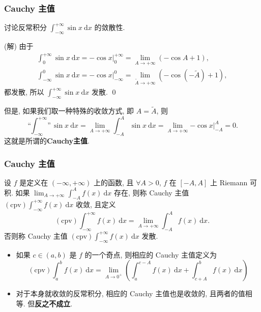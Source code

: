 \begin{frame}
\frametitle{Cauchy 主值}

\begin{eg}
讨论反常积分 $\int_{-\infty}^{+\infty} \sin x~ \mathrm{d} x$ 的敛散性.
\end{eg}

\pause
\vspace{0.5em}

\startproof[bg=yellow, fg=red](解)
由于
\begin{gather*}
\int_0^{+\infty} \sin x ~ \mathrm{d} x = \left. -\cos x \right|_0^{+\infty} = \lim_{A \to +\infty} \left(-\cos A + 1\right), \\
\int_{-\infty}^0 \sin x ~ \mathrm{d} x = \left. -\cos x \right|_{-\infty}^0 = \lim_{\widetilde{A} \to +\infty} \left(-\cos(-\widetilde{A}) + 1\right),
\end{gather*}
都发散, 所以 $\int_{-\infty}^{+\infty} \sin x ~ \mathrm{d} x$ 发散.
\qed

\pause
\vspace{0.5em}

但是, 如果我们取一种特殊的收敛方式, 即 $A = \widetilde{A}$, 则
\[
\text{``$\int_{-\infty}^{+\infty}$''} \sin x ~ \mathrm{d} x = \lim_{A \to +\infty} \int_{-A}^A \sin x~ \mathrm{d} x = \lim_{A \to +\infty} \left. -\cos x \right|_{-A}^A = 0.
\]
这就是所谓的\textbf{Cauchy主值}.

\end{frame}


\begin{frame}
\frametitle{Cauchy 主值}

\begin{Def}[Cauchy 主值]
设 $f$ 是定义在 $(-\infty, +\infty)$ 上的函数, 且 $\forall A > 0$, $f$ 在 $[-A, A]$ 上 Riemann 可积. 如果 $\lim_{A \to +\infty} \int_{-A}^A f(x) ~ \mathrm{d} x$ 存在, 则称 Cauchy 主值 $\mathrm{(cpv)} \int_{-\infty}^{+\infty} f(x) ~ \mathrm{d} x$ 收敛, 且定义
\[\mathrm{(cpv)} \int_{-\infty}^{+\infty} f(x) ~ \mathrm{d} x = \lim_{A \to +\infty} \int_{-A}^A f(x) ~ \mathrm{d} x.\]
否则称 Cauchy 主值 $\mathrm{(cpv)} \int_{-\infty}^{+\infty} f(x) ~ \mathrm{d} x$ 发散.
\end{Def}

\begin{remark}
\begin{itemize}
\item 如果 $c \in (a, b)$ 是 $f$ 的一个奇点, 则相应的 Cauchy 主值定义为
\[
\mathrm{(cpv)} \int_a^b f(x) ~ \mathrm{d} x = \lim_{A \to 0^+} \left( \int_a^{c-A} f(x) ~ \mathrm{d} x + \int_{c+A}^b f(x) ~ \mathrm{d} x \right)
\]
\item 对于本身就收敛的反常积分, 相应的 Cauchy 主值也是收敛的, 且两者的值相等. 但\textbf{反之不成立}.
\end{itemize}
\end{remark}

\end{frame}

